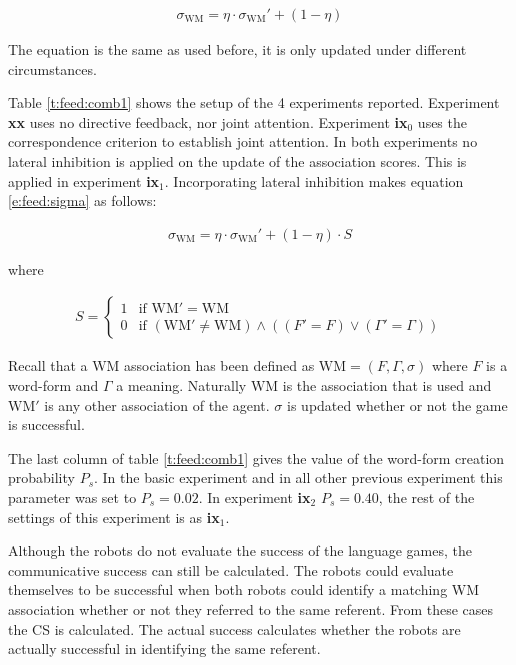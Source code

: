 \begin{eqnarray}
\sigma_{\mbox{WM}} = \eta \cdot \sigma_{\mbox{WM}}' + (1-\eta)
\label{e:feed:sigma}
\end{eqnarray}

\n
The equation is the same as used before, it is only updated under different circumstances.

Table \ref{t:feed:comb1} shows the setup of the 4 experiments reported. Experiment {\bf xx} uses no directive feedback, nor joint attention. Experiment {\bf ix$_0$} uses the correspondence criterion to establish joint attention. In both experiments no lateral inhibition is applied on the update of the association scores. This is applied in experiment {\bf ix$_1$}. Incorporating lateral inhibition makes equation \ref{e:feed:sigma} as follows:

\begin{eqnarray}
\sigma_{\mbox{WM}} = \eta \cdot \sigma_{\mbox{WM}}' + (1-\eta) \cdot S
\label{e:feed:sigma1}
\end{eqnarray}

\n
where

\begin{eqnarray}
S = \left\{ \begin{array}{rl}
1 & \mbox{if WM}' = \mbox{WM}\\
0 & \mbox{if } (\mbox{WM}' \neq \mbox{WM}) \wedge ((F'=F) \vee (\Gamma' = \Gamma))
\end{array}\right.
\end{eqnarray}

\n
Recall that a WM association has been defined as $\mbox{WM}=(F,\Gamma,\sigma)$ where $F$ is a word-form and $\Gamma$ a meaning. Naturally $\mbox{WM}$ is the association that is used and $\mbox{WM}'$ is any other association of the agent. $\sigma$ is updated whether or not the game is successful.

The last column of table \ref{t:feed:comb1} gives the value of the word-form creation probability $P_s$. In the basic experiment and in all other previous experiment this parameter was set to $P_s=0.02$. In experiment {\bf ix$_2$} $P_s=0.40$, the rest of the settings of this experiment is as {\bf ix$_1$}.

Although the robots do not evaluate the success of the language games, the communicative success can still be calculated. The robots could evaluate themselves to be successful when both robots could identify a matching WM association whether or not they referred to the same referent. From these cases the CS is calculated. The actual success calculates whether the robots are actually successful in identifying the same referent.

